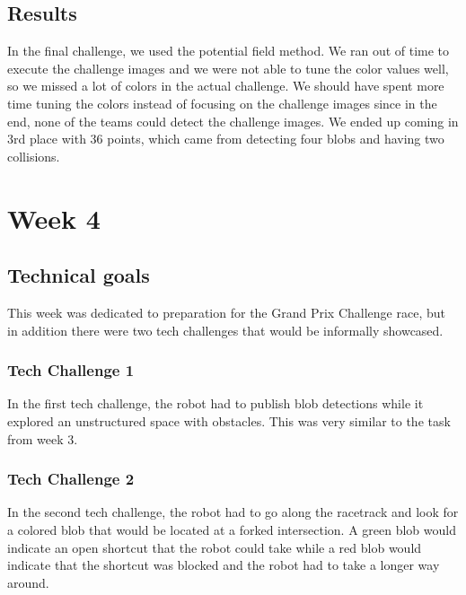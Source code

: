 \documentclass[journal, a4paper]{IEEEtran}
\begin{document}
\subsection{Results}
In the final challenge, we used the potential field method. We ran out of time to execute the challenge images and we were not able to tune the color values well, so we missed a lot of colors in the actual challenge. We should have spent more time tuning the colors instead of focusing on the challenge images since in the end, none of the teams could detect the challenge images. We ended up coming in 3rd place with 36 points, which came from detecting four blobs and having two collisions. 

\section{Week 4}
\subsection{Technical goals}
This week was dedicated to preparation for the Grand Prix Challenge race, but in addition there were two tech challenges that would be informally showcased. 
\subsubsection{Tech Challenge 1}
In the first tech challenge, the robot had to publish blob detections while it explored an unstructured space with obstacles. This was very similar to the task from week 3.
\subsubsection{Tech Challenge 2}
In the second tech challenge, the robot had to go along the racetrack and look for a colored blob that would be located at a forked intersection. A green blob would indicate an open shortcut that the robot could take while a red blob would indicate that the shortcut was blocked and the robot had to take a longer way around. \\ 
\end{document}
